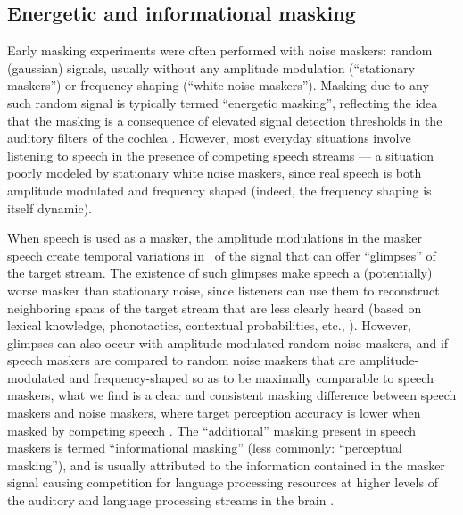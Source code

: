 \subsection{Energetic and informational masking}
Early masking experiments \citep[e.g.,][]{HawkinsStevens1950,Tolhurst1957,PollackPickett1958} were often performed with noise maskers: random (gaussian) signals, usually without any amplitude modulation (“stationary maskers”) or frequency shaping (“white noise maskers”).  Masking due to any such random signal is typically termed “energetic masking”, reflecting the idea that the masking is a consequence of elevated signal detection thresholds in the auditory filters of the cochlea \citep{DurlachEtAl2003,xxx}.  However, most everyday situations involve listening to speech in the presence of competing speech streams — a situation poorly modeled by stationary white noise maskers, since real speech is both amplitude modulated and frequency shaped (indeed, the frequency shaping is itself dynamic).  

When speech is used as a masker, the amplitude modulations in the masker speech create temporal variations in \snr\ of the signal that can offer “glimpses” of the target stream.  The existence of such glimpses make speech a (potentially) worse masker than stationary noise, since listeners can use them to reconstruct neighboring spans of the target stream that are less clearly heard (based on lexical knowledge, phonotactics, contextual probabilities, etc., \citealt{xxx}).  However, glimpses can also occur with amplitude-modulated random noise maskers, and if speech maskers are compared to random noise maskers that are amplitude-modulated and frequency-shaped so as to be maximally comparable to speech maskers, what we find is a clear and consistent masking difference between speech maskers and noise maskers, where target perception accuracy is lower when masked by competing speech \citep[e.g.,][]{CarhartEtAl1969,LewisEtAl1988,SimpsonCooke2005}.  The “additional” masking present in speech maskers is termed “informational masking” (less commonly: “perceptual masking”), and is usually attributed to the information contained in the masker signal causing competition for language processing resources at higher levels of the auditory and language processing streams in the brain \citep{DurlachEtAl2003,xxx}.


